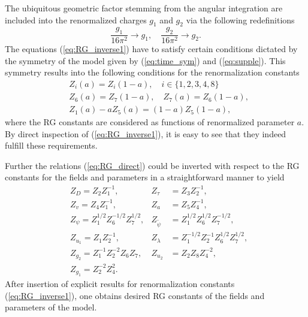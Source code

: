 \documentclass[aps,pre,url,twocolumn,superscriptaddress]{revtex4-1}
\begin{document}
The ubiquitous geometric factor stemming from the angular integration
are included into the renormalized charges $g_1$ and $g_2$ via the following
redefinitions
\begin{equation}
   \frac{g_1}{16\pi^2} \rightarrow g_1, \quad
   \frac{g_2}{16\pi^2} \rightarrow g_2.
\end{equation}
The equations (\ref{eq:RG_inverse1}) have to satisfy certain conditions
dictated by the symmetry of the model
given by (\ref{eq:time_sym}) and (\ref{eq:supple}). This symmetry results into the
following conditions \cite{AntKap10} for the renormalization constants
\begin{align}
   \label{eq:RG_cond}
   & Z_i(a) = Z_i(1-a),\quad i\in\{1,2,3,4,8 \} \nonumber \\
   & Z_6(a) = Z_7(1-a), \quad Z_7(a) = Z_6(1-a), \nonumber \\
   & Z_1(a) - aZ_5(a) = (1-a) Z_5(1-a), 
\end{align}
where the RG constants are considered as functions of renormalized 
parameter $a$.
By direct inspection of (\ref{eq:RG_inverse1}),
it is easy to see that they indeed fulfill these requirements.

Further the relations (\ref{eq:RG_direct}) could be inverted with respect
to the RG constants for the fields and parameters in a straightforward manner to yield
\begin{align}
  \label{eq:RG_inverse2}
  &Z_D = Z_2 Z_1^{-1},
  &Z_\tau& = Z_3 Z_2^{-1},\nonumber \\
  &Z_v = Z_4 Z_1^{-1}, 
  &Z_a& = Z_5 Z_4^{-1},\nonumber \\ 
  &Z_{\psi} = Z_1^{1/2} Z_6^{-1/2} Z_7^{1/2},
  & Z_{\tilde{\psi}}& = Z_1^{1/2} Z_6^{1/2} Z_7^{-1/2},\nonumber \\ 
  & Z_{u_1} = Z_1 Z_2^{-1},     
  & Z_{\lambda}& = Z_{1}^{-1/2} Z_2^{-1} Z_6^{1/2} Z_7^{1/2},\nonumber \\ 
  & Z_{g_2} = Z_1^{-1} Z_2^{-2} Z_6 Z_7,
  & Z_{u_2} & = Z_2 Z_8 Z_4^{-2}, \nonumber  \\  
  &Z_{g_1} = Z_2^{-2} Z_4^2. %
\end{align}
After insertion of explicit results for renormalization constants
(\ref{eq:RG_inverse1}), one obtains desired RG constants of the fields
and parameters of the model.


\end{document}
